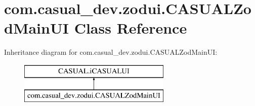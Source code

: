 \hypertarget{classcom_1_1casual__dev_1_1zodui_1_1_c_a_s_u_a_l_zod_main_u_i}{\section{com.\-casual\-\_\-dev.\-zodui.\-C\-A\-S\-U\-A\-L\-Zod\-Main\-U\-I Class Reference}
\label{classcom_1_1casual__dev_1_1zodui_1_1_c_a_s_u_a_l_zod_main_u_i}
}
Inheritance diagram for com.\-casual\-\_\-dev.\-zodui.\-C\-A\-S\-U\-A\-L\-Zod\-Main\-U\-I\-:\begin{figure}[H]
\begin{center}
\leavevmode
\includegraphics[height=2.000000cm]{classcom_1_1casual__dev_1_1zodui_1_1_c_a_s_u_a_l_zod_main_u_i}
\end{center}
\end{figure}
